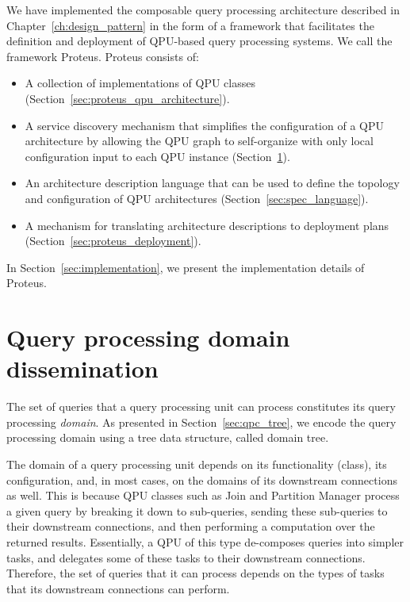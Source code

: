 We have implemented the composable query processing architecture described in Chapter~\ref{ch:design_pattern} in the form
of a framework that facilitates the definition and deployment of QPU-based query processing systems.
We call the framework Proteus.
Proteus consists of:

\begin{itemize}
  \item A collection of implementations of QPU classes (Section~\ref{sec:proteus_qpu_architecture}).

  \item A service discovery mechanism that simplifies the configuration of a QPU architecture by allowing the QPU graph to self-organize
  with only local configuration input to each QPU instance (Section~\ref{sec:domain_dissemination}).

  \item An architecture description language that can be used to define the topology and configuration of QPU architectures
  (Section~\ref{sec:spec_language}).

  \item A mechanism for translating architecture descriptions to deployment plans (Section~\ref{sec:proteus_deployment}).
\end{itemize}

\noindent
In Section~\ref{sec:implementation}, we present the implementation details of Proteus.


\section{Query processing domain dissemination}
\label{sec:domain_dissemination}
The set of queries that a query processing unit can process constitutes its query processing \textit{domain}.
As presented in Section~\ref{sec:qpc_tree},
we encode the query processing domain using a tree data structure, called domain tree.

The domain of a query processing unit depends on its functionality (class), its configuration, and, in most cases,
on the domains of its downstream connections as well.
This is because QPU classes such as Join and Partition Manager process a given query by breaking it down to sub-queries,
sending these sub-queries to their downstream connections,
and then performing a computation over the returned results.
Essentially, a QPU of this type de-composes queries into simpler tasks, and delegates some of these tasks to their downstream connections.
Therefore, the set of queries that it can process depends on the types of tasks that its downstream connections can perform.

